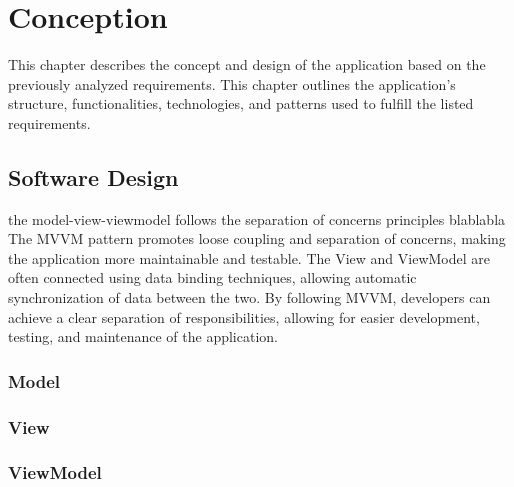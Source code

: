 \chapter{Conception}
This chapter describes the concept and design of the application based on the previously analyzed requirements. This chapter outlines the application's structure, functionalities, technologies, and patterns used to fulfill the listed requirements.








\section{Software Design}
the model-view-viewmodel follows the separation of concerns principles blablabla
The MVVM pattern promotes loose coupling and separation of concerns, making the application more maintainable and testable. The View and ViewModel are often connected using data binding techniques, allowing automatic synchronization of data between the two.
By following MVVM, developers can achieve a clear separation of responsibilities, allowing for easier development, testing, and maintenance of the application.
\subsection{Model}
\subsection{View}
\subsection{ViewModel}

